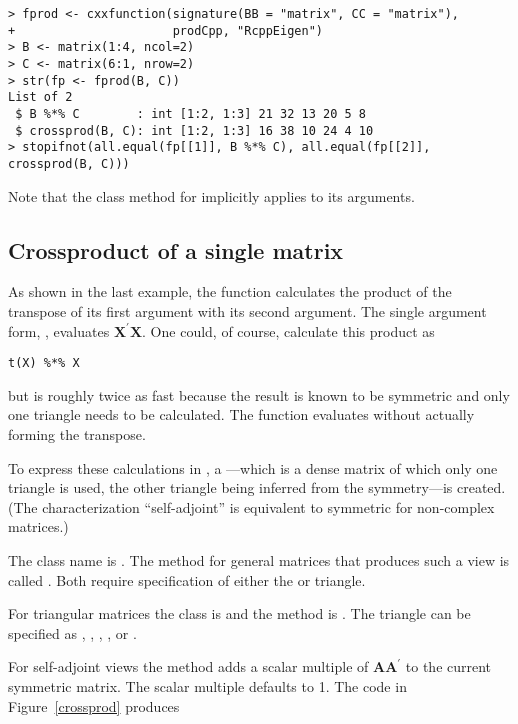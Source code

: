 \documentclass[shortnames,article]{jss}
\begin{document}
\begin{verbatim}
> fprod <- cxxfunction(signature(BB = "matrix", CC = "matrix"), 
+                      prodCpp, "RcppEigen")
> B <- matrix(1:4, ncol=2)
> C <- matrix(6:1, nrow=2)
> str(fp <- fprod(B, C))
List of 2
 $ B %*% C        : int [1:2, 1:3] 21 32 13 20 5 8
 $ crossprod(B, C): int [1:2, 1:3] 16 38 10 24 4 10
> stopifnot(all.equal(fp[[1]], B %*% C), all.equal(fp[[2]], crossprod(B, C)))
\end{verbatim}
Note that the  class method for 
implicitly applies  to its arguments.

\subsection{Crossproduct of a single matrix}
\label{sec:crossproduct}

As shown in the last example, the  function
 calculates the product of the transpose of its first
argument with its second argument.  The single argument form,
, evaluates $\bm X^\prime\bm X$.  One could, of
course, calculate this product as
\begin{verbatim}
t(X) %*% X
\end{verbatim}
but  is roughly twice as fast because the result is
known to be symmetric and only one triangle needs to be calculated.
The function  evaluates 
without actually forming the transpose.

To express these calculations in , a
---which is a dense matrix of which only one
triangle is used, the other triangle being inferred from the
symmetry---is created.  (The characterization ``self-adjoint'' is
equivalent to symmetric for non-complex matrices.)

The  class name is .  The method for
general matrices that produces such a view is called
.  Both require specification of either the
 or  triangle.

For triangular matrices the class is  and the
method is .  The triangle can be specified as
, , , ,
 or .

For self-adjoint views the  method adds a scalar multiple
of $\bm A\bm A^\prime$ to the current symmetric matrix.  The scalar
multiple defaults to 1.  The code in Figure~\ref{crossprod} produces
\end{document}
